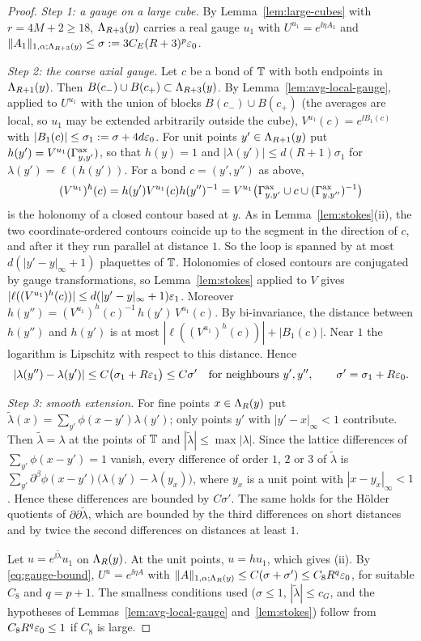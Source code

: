 \begin{proof}
\emph{Step 1: a gauge on a large cube.} By Lemma~\ref{lem:large-cubes} with $r=4M+2\ge18$, $\Lambda_{R+3}(y)$ carries a real gauge $u_1$ with $U^{u_1}=e^{\ii\eta A_1}$ and $\|A_1\|_{1,\alpha;\Lambda_{R+3}(y)}\le\sigma:=3C_E(R+3)^p\varepsilon_0$.

\emph{Step 2: the coarse axial gauge.} Let $c$ be a bond of $\mathbb T$ with both endpoints in $\Lambda_{R+1}(y)$. Then $B(c_-)\cup B(c_+)\subset\Lambda_{R+3}(y)$. By Lemma~\ref{lem:avg-local-gauge}, applied to $U^{u_1}$ with the union of blocks $B(c_-)\cup B(c_+)$ (the averages are local, so $u_1$ may be extended arbitrarily outside the cube), $V^{u_1}(c)=e^{\ii B_1(c)}$ with $|B_1(c)|\le\sigma_1:=\sigma+4d\varepsilon_0$. For unit points $y'\in\Lambda_{R+1}(y)$ put $h(y')=V^{u_1}(\Gamma^{\rm ax}_{y,y'})$, so that $h(y)=1$ and $|\lambda(y')|\le d(R+1)\sigma_1$ for $\lambda(y')=\ell(h(y'))$. For a bond $c=(y',y'')$ as above,
\[
(V^{u_1})^h(c)=h(y')V^{u_1}(c)h(y'')^{-1}=V^{u_1}\big(\Gamma^{\rm ax}_{y,y'}\cup c\cup(\Gamma^{\rm ax}_{y,y''})^{-1}\big)
\]
is the holonomy of a closed contour based at $y$. As in Lemma~\ref{lem:stokes}(ii), the two coordinate-ordered contours coincide up to the segment in the direction of $c$, and after it they run parallel at distance $1$. So the loop is spanned by at most $d(|y'-y|_\infty+1)$ plaquettes of $\mathbb T$. Holonomies of closed contours are conjugated by gauge transformations, so Lemma~\ref{lem:stokes} applied to $V$ gives $|\ell((V^{u_1})^h(c))|\le d(|y'-y|_\infty+1)\varepsilon_1$. Moreover $h(y'')=(V^{u_1})^h(c)^{-1}\,h(y')\,V^{u_1}(c)$. By bi-invariance, the distance between $h(y'')$ and $h(y')$ is at most $|\ell((V^{u_1})^h(c))|+|B_1(c)|$. Near $1$ the logarithm is Lipschitz with respect to this distance. Hence
\[
|\lambda(y'')-\lambda(y')|\le C\big(\sigma_1+R\varepsilon_1\big)\le C\sigma'\quad\text{for neighbours }y',y'',\qquad\sigma'=\sigma_1+R\varepsilon_0 .
\]

\emph{Step 3: smooth extension.} For fine points $x\in\Lambda_R(y)$ put $\tilde\lambda(x)=\sum_{y'}\phi(x-y')\lambda(y')$; only points $y'$ with $|y'-x|_\infty<1$ contribute. Then $\tilde\lambda=\lambda$ at the points of $\mathbb T$ and $|\tilde\lambda|\le\max|\lambda|$. Since the lattice differences of $\sum_{y'}\phi(x-y')=1$ vanish, every difference of order $1$, $2$ or $3$ of $\tilde\lambda$ is $\sum_{y'}\partial^\beta\phi(x-y')\big(\lambda(y')-\lambda(y_x)\big)$, where $y_x$ is a unit point with $|x-y_x|_\infty<1$. Hence these differences are bounded by $C\sigma'$. The same holds for the H\"older quotients of $\partial\partial\tilde\lambda$, which are bounded by the third differences on short distances and by twice the second differences on distances at least $1$.

Let $u=e^{\ii\tilde\lambda}u_1$ on $\Lambda_R(y)$. At the unit points, $u=hu_1$, which gives (ii). By \eqref{eq:gauge-bound}, $U^u=e^{\ii\eta A}$ with $\|A\|_{1,\alpha;\Lambda_R(y)}\le C(\sigma+\sigma')\le C_8R^q\varepsilon_0$, for suitable $C_8$ and $q=p+1$. The smallness conditions used ($\sigma\le1$, $|\tilde\lambda|\le c_G$, and the hypotheses of Lemmas~\ref{lem:avg-local-gauge} and~\ref{lem:stokes}) follow from $C_8R^q\varepsilon_0\le1$ if $C_8$ is large.
\end{proof}

